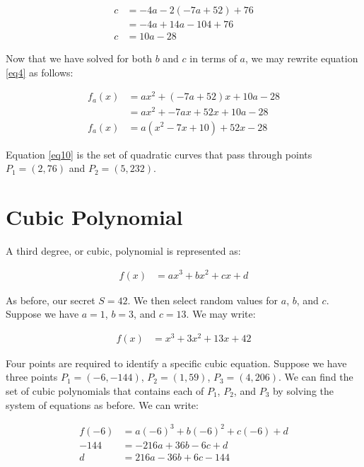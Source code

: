 \documentclass[preview,border=3mm]{article}
\begin{document}
\begin{align}
    c &= -4a - 2(-7a + 52) + 76 \nonumber \\
      &= -4a + 14a - 104 + 76 \nonumber \\
    c &= 10a - 28 \label{eq9}
\end{align}

\noindent
Now that we have solved for both $b$ and $c$ in terms of $a$, we may rewrite
equation \ref{eq4} as follows:

\begin{align}
    f_a(x) &= ax^2 + (-7a + 52)x + 10a - 28 \nonumber \\
           &= ax^2 + -7ax + 52x + 10a - 28 \nonumber \\
    f_a(x) &= a(x^2 - 7x + 10) + 52x - 28 \label{eq10}
\end{align}

\noindent
Equation \ref{eq10} is the set of quadratic curves that pass through points
$P_1 = (2, 76)$ and $P_2 = (5, 232)$.


\section{Cubic Polynomial}

\noindent
A third degree, or cubic, polynomial is represented as:

\begin{align}
    f(x) &= ax^3 + bx^2 + cx + d \label{eq11}
\end{align}

\noindent
As before, our secret $S = 42$. We then select random values for $a$, $b$, and
$c$. Suppose we have $a = 1$, $b = 3$, and $c = 13$. We may write:

\begin{align}
    f(x) &= x^3 + 3x^2 + 13x + 42 \label{eq12}
\end{align}

\noindent
Four points are required to identify a specific cubic equation. Suppose we have
three points $P_1 = (-6, -144)$, $P_2 = (1, 59)$, $P_3 = (4, 206)$. We can find
the set of cubic polynomials that contains each of $P_1$, $P_2$, and $P_3$ by
solving the system of equations as before. We can write:

\begin{align}
    f(-6) &= a(-6)^3 + b(-6)^2 + c(-6) + d \nonumber \\
    -144  &= -216a + 36b - 6c + d \nonumber \\
    d     &= 216a - 36b + 6c - 144 \label{eq13}
\end{align}
\end{document}
